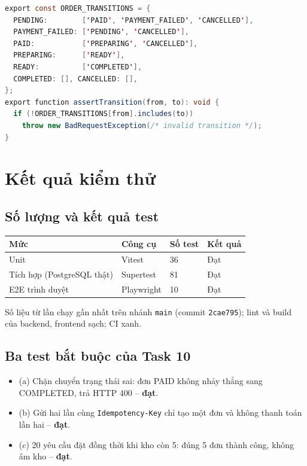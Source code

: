 \documentclass[a4paper]{article}
\begin{document}
\begin{mdframed}[hidealllines=true,backgroundcolor=magenta!10]
\begin{lstlisting}[language=Java]
export const ORDER_TRANSITIONS = {
  PENDING:        ['PAID', 'PAYMENT_FAILED', 'CANCELLED'],
  PAYMENT_FAILED: ['PENDING', 'CANCELLED'],
  PAID:           ['PREPARING', 'CANCELLED'],
  PREPARING:      ['READY'],
  READY:          ['COMPLETED'],
  COMPLETED: [], CANCELLED: [],
};
export function assertTransition(from, to): void {
  if (!ORDER_TRANSITIONS[from].includes(to))
    throw new BadRequestException(/* invalid transition */);
}
\end{lstlisting}
\end{mdframed}

\section{Kết quả kiểm thử}
\subsection{Số lượng và kết quả test}
\begin{center}
\small\everymath{}
\begin{tabular}{@{}p{3.3cm}p{2.2cm}p{1.8cm}p{5.4cm}@{}}
\toprule
\textbf{Mức} & \textbf{Công cụ} & \textbf{Số test} & \textbf{Kết quả} \\ \midrule
Unit & Vitest & 36 & Đạt \\
Tích hợp (PostgreSQL thật) & Supertest & 81 & Đạt \\
E2E trình duyệt & Playwright & 10 & Đạt \\
\bottomrule
\end{tabular}
\end{center}
Số liệu từ lần chạy gần nhất trên nhánh \texttt{main} (commit \texttt{2cae795}); lint và build của backend, frontend sạch; CI xanh.

\subsection{Ba test bắt buộc của Task 10}
\begin{itemize}
    \item (a) Chặn chuyển trạng thái sai: đơn PAID không nhảy thẳng sang COMPLETED, trả HTTP 400 -- \textbf{đạt}.
    \item (b) Gửi hai lần cùng \texttt{Idempotency-Key} chỉ tạo một đơn và không thanh toán lần hai -- \textbf{đạt}.
    \item (c) 20 yêu cầu đặt đồng thời khi kho còn 5: đúng 5 đơn thành công, không âm kho -- \textbf{đạt}.
\end{itemize}
\end{document}
